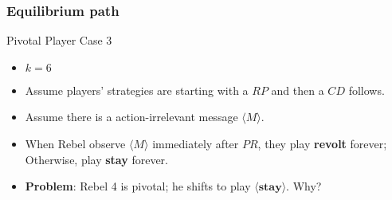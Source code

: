 \documentclass[10pt]{beamer}
\begin{document}
\begin{frame}
\frametitle{Equilibrium path}

Pivotal Player Case 3

\begin{itemize}
\item $k=6$
\item Assume players' strategies are starting with a $RP$ and then a $CD$ follows. 
\item Assume there is a action-irrelevant message $\langle M \rangle$.
\item When Rebel observe $\langle M \rangle$ immediately after $PR$, they play \textbf{revolt} forever; Otherwise, play \textbf{stay} forever.

\end{itemize}

\begin{center}
\end{center}

\begin{itemize}
\item \textbf{Problem}: Rebel 4 is pivotal; he shifts to play $\langle \textbf{stay} \rangle$. Why?
\end{itemize}

\end{frame}
\end{document}
